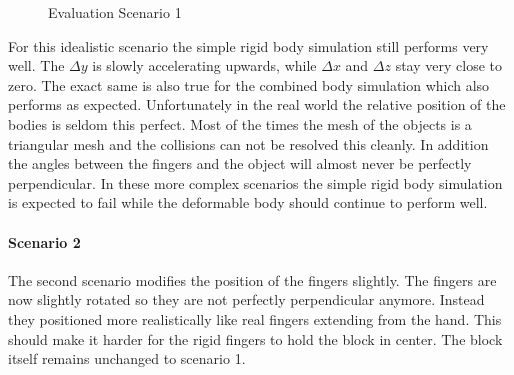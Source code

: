 \begin{figure}[htb]
	\centering
	\caption{Evaluation Scenario 1}
\end{figure}

For this idealistic scenario the simple rigid body simulation still performs very well.   The $\Delta y$ is slowly accelerating upwards, while $\Delta x$ and $\Delta z$ stay very close to zero. The exact same is also true for the combined body simulation which also performs as expected. Unfortunately in the real world the relative position of the bodies is seldom this perfect. Most of the times the mesh of the objects is a triangular mesh and the collisions can not be resolved this cleanly. In addition the angles between the fingers and the object will almost never be perfectly perpendicular. In these more complex scenarios the simple rigid body simulation is expected to fail while the deformable body should continue to perform well.

\clearpage
\paragraph{Scenario 2}
The second scenario modifies the position of the fingers slightly. The fingers are now slightly rotated so they are not perfectly perpendicular anymore. Instead they positioned more realistically like real fingers extending from the hand. This should make it harder for the rigid fingers to hold the block in center. The block itself remains unchanged to scenario 1.

